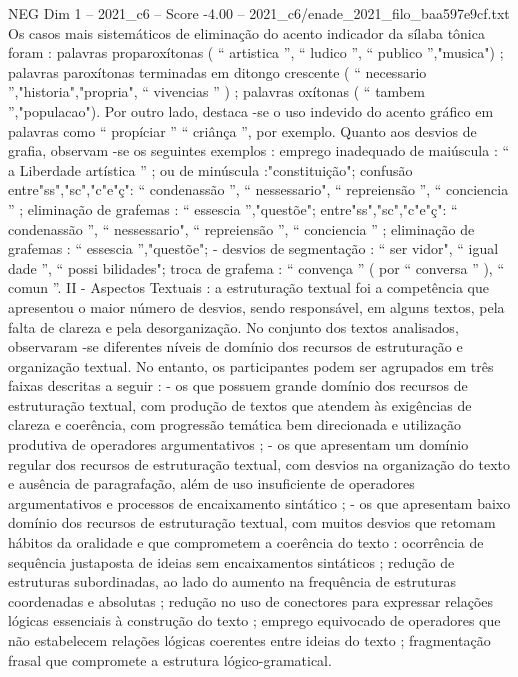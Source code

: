 \begin{textsample}{NEG Dim 1 – 2021\_c6 – Score -4.00 – 2021\_c6/enade\_2021\_filo\_baa597e9cf.txt}
Os casos mais sistemáticos de eliminação do acento indicador da sílaba tônica foram : palavras proparoxítonas ( “ artistica ”, “ ludico ”, “ publico ”,"musica") ; palavras paroxítonas terminadas em ditongo crescente ( “ necessario ”,"historia","propria", “ vivencias ” ) ; palavras oxítonas ( “ tambem ”,"populacao").
Por outro lado, destaca -se o uso indevido do acento gráfico em palavras como “ propíciar ” “ criânça ”, por exemplo.
Quanto aos desvios de grafia, observam -se os seguintes exemplos : emprego inadequado de maiúscula : “ a Liberdade artística ” ; ou de minúscula :"constituição"; confusão entre"ss","sc","c"e"ç": “ condenassão ”, “ nessessario", “ repreiensão ”, “ conciencia ” ; eliminação de grafemas : “ essescia ”,"questõe"; entre"ss","sc","c"e"ç": “ condenassão ”, “ nessessario", “ repreiensão ”, “ conciencia ” ; eliminação de grafemas : “ essescia ”,"questõe"; - desvios de segmentação : “ ser vidor", “ igual dade ”, “ possi bilidades"; troca de grafema : “ convença ” ( por “ conversa ” ), “ comun ”.
II - Aspectos Textuais : a estruturação textual foi a competência que apresentou o maior número de desvios, sendo responsável, em alguns textos, pela falta de clareza e pela desorganização.
No conjunto dos textos analisados, observaram -se diferentes níveis de domínio dos recursos de estruturação e organização textual.
No entanto, os participantes podem ser agrupados em três faixas descritas a seguir : - os que possuem grande domínio dos recursos de estruturação textual, com produção de textos que atendem às exigências de clareza e coerência, com progressão temática bem direcionada e utilização produtiva de operadores argumentativos ; - os que apresentam um domínio regular dos recursos de estruturação textual, com desvios na organização do texto e ausência de paragrafação, além de uso insuficiente de operadores argumentativos e processos de encaixamento sintático ; - os que apresentam baixo domínio dos recursos de estruturação textual, com muitos desvios que retomam hábitos da oralidade e que comprometem a coerência do texto : ocorrência de sequência justaposta de ideias sem encaixamentos sintáticos ; redução de estruturas subordinadas, ao lado do aumento na frequência de estruturas coordenadas e absolutas ; redução no uso de conectores para expressar relações lógicas essenciais à construção do texto ; emprego equivocado de operadores que não estabelecem relações lógicas coerentes entre ideias do texto ; fragmentação frasal que compromete a estrutura lógico-gramatical.

\end{textsample}
